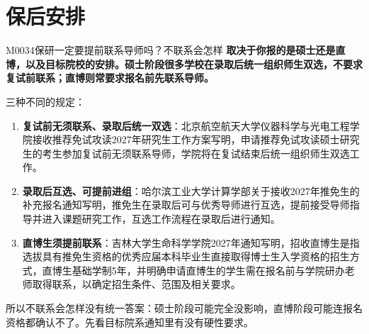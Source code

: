\section{保后安排}
\begin{qa}{M0034}{保研一定要提前联系导师吗？不联系会怎样}
\textbf{取决于你报的是硕士还是直博，以及目标院校的安排。硕士阶段很多学校在录取后统一组织师生双选，不要求复试前联系；直博则常要求报名前先联系导师。}

三种不同的规定：

\begin{enumerate}
  \item \textbf{复试前无须联系、录取后统一双选}：北京航空航天大学仪器科学与光电工程学院接收推荐免试攻读2027年研究生工作方案写明，申请推荐免试攻读硕士研究生的考生参加复试前无须联系导师，学院将在复试结束后统一组织师生双选工作。
  \item \textbf{录取后互选、可提前进组}：哈尔滨工业大学计算学部关于接收2027年推免生的补充报名通知写明，推免生在录取后可与优秀导师进行互选，提前接受导师指导并进入课题研究工作，互选工作流程在录取后进行通知。
  \item \textbf{直博生须提前联系}：吉林大学生命科学学院2027年通知写明，招收直博生是指选拔具有推免生资格的优秀应届本科毕业生直接取得博士生入学资格的招生方式，直博生基础学制5年，并明确申请直博生的学生需在报名前与学院研办老师取得联系，以确定招生条件、范围及相关要求。
\end{enumerate}

所以不联系会怎样没有统一答案：硕士阶段可能完全没影响，直博阶段可能连报名资格都确认不了。先看目标院系通知里有没有硬性要求。
\end{qa}

